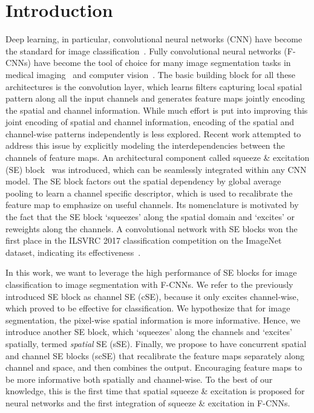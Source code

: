 \documentclass{llncs}
\begin{document}
\section{Introduction}
\label{sec:intro}
Deep learning, in particular, convolutional neural networks (CNN) have become the standard for image classification~\cite{alexnet2012,resnet}. Fully convolutional neural networks (F-CNNs) have become the tool of choice for many image segmentation tasks in medical imaging~\cite{Unet,ecb2017,quickNat2018} and computer vision~\cite{longfcn2015,deconvnet2015,segnet,densenet}. The basic building block for all these architectures is the convolution layer, which learns filters capturing local spatial pattern along all the input channels and generates feature maps jointly encoding the spatial and channel information. While much effort is put into improving this joint encoding of spatial and channel information, encoding of the spatial and channel-wise patterns independently is less explored. Recent work attempted to address this issue by explicitly modeling the interdependencies between the channels of  feature maps. An architectural component called squeeze \& excitation (SE) block~\cite{SE2017} was introduced, which can be seamlessly integrated within any CNN model. The SE block factors out the spatial dependency by global average pooling to learn a channel specific descriptor, which is used to recalibrate the feature map to emphasize on useful channels. Its nomenclature is motivated by the fact that the SE block `squeezes' along the spatial domain and `excites' or reweights along the channels. A convolutional network with SE blocks won the first place in the ILSVRC 2017 classification competition on the ImageNet dataset, indicating its effectiveness~\cite{SE2017}.

In this work, we want to leverage the high performance of SE blocks for image classification to image segmentation with F-CNNs. We refer to the previously introduced SE block as channel SE (cSE), because it  only excites channel-wise, which proved to be effective for classification. We hypothesize that for image segmentation, the pixel-wise spatial information is more informative. Hence, we introduce another SE block, which `squeezes' along the channels and `excites' spatially, termed \emph{spatial} SE (sSE). Finally, we propose to have concurrent spatial and channel SE blocks (scSE) that recalibrate the feature maps separately  along channel and space, and then combines the output. Encouraging feature maps to be more informative both spatially and channel-wise. To the best of our knowledge, this is the first time that spatial squeeze \& excitation is proposed for neural networks  and the first integration of squeeze \& excitation  in F-CNNs. 
\end{document}
